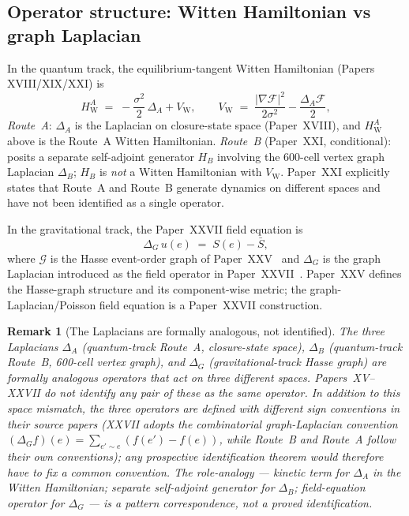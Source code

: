\documentclass[12pt]{article}
\newtheorem{remark}[theorem]{Remark}
\newcommand{\Gcal}{\mathcal{G}}
\newcommand{\Fcal}{\mathcal{F}}
\newcommand{\HW}{H_{\mathrm{W}}}
\begin{document}
\subsection{Operator structure: Witten Hamiltonian vs graph Laplacian}

In the quantum track, the equilibrium-tangent Witten Hamiltonian (Papers XVIII/XIX/XXI) is
\begin{equation}
    \HW^{A} \;=\; -\frac{\sigma^2}{2}\,\Delta_A + V_{\mathrm{W}}, \qquad V_{\mathrm{W}} \;=\; \frac{|\nabla\Fcal|^2}{2\sigma^2} - \frac{\Delta_A \Fcal}{2},
\end{equation}
\emph{Route~A}: $\Delta_A$ is the Laplacian on closure-state space (Paper~XVIII), and $\HW^{A}$ above is the Route~A Witten Hamiltonian. \emph{Route~B} (Paper~XXI, conditional): posits a separate self-adjoint generator $H_B$ involving the 600-cell vertex graph Laplacian $\Delta_B$; $H_B$ is \emph{not} a Witten Hamiltonian with $V_{\mathrm{W}}$. Paper~XXI explicitly states that Route~A and Route~B generate dynamics on different spaces and have not been identified as a single operator.

In the gravitational track, the Paper~XXVII field equation is
\begin{equation}
    \Delta_G\, u(e) \;=\; S(e) - \bar{S},
\end{equation}
where $\Gcal$ is the Hasse event-order graph of Paper~XXV~\citep{SmartXXV} and $\Delta_G$ is the graph Laplacian introduced as the field operator in Paper~XXVII~\citep{SmartXXVII}. Paper~XXV defines the Hasse-graph structure and its component-wise metric; the graph-Laplacian/Poisson field equation is a Paper~XXVII construction.

\begin{remark}[The Laplacians are formally analogous, not identified]
The three Laplacians $\Delta_A$ (quantum-track Route~A, closure-state space), $\Delta_B$ (quantum-track Route~B, 600-cell vertex graph), and $\Delta_G$ (gravitational-track Hasse graph) are \emph{formally analogous} operators that act on \emph{three different spaces}. Papers~XV--XXVII do not identify any pair of these as the same operator. In addition to this space mismatch, the three operators are defined with different sign conventions in their source papers (XXVII adopts the combinatorial graph-Laplacian convention $(\Delta_G f)(e) = \sum_{e' \sim e} (f(e') - f(e))$, while Route~B and Route~A follow their own conventions); any prospective identification theorem would therefore have to fix a common convention. The role-analogy --- kinetic term for $\Delta_A$ in the Witten Hamiltonian; separate self-adjoint generator for $\Delta_B$; field-equation operator for $\Delta_G$ --- is a pattern correspondence, not a proved identification.
\end{remark}
\end{document}
